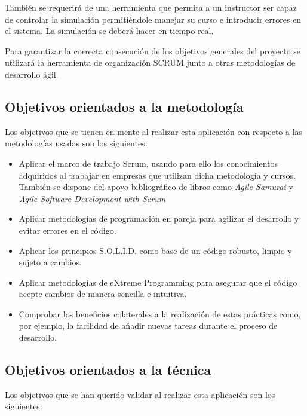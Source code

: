 \documentclass[12pt,a4paper,spanish]{book} %
\begin{document}
También se requerirá de una herramienta que permita a un instructor ser capaz de controlar la simulación permitiéndole manejar su curso e introducir errores en el sistema. La simulación se deberá hacer en tiempo real.

Para garantizar la correcta consecución de los objetivos generales del proyecto se utilizará la herramienta de organización SCRUM junto a otras metodologías de desarrollo ágil.

\subsection{Objetivos orientados a la metodología}

Los objetivos que se tienen en mente al realizar esta aplicación con respecto a
las metodologías usadas son los siguientes:

\begin{itemize}
  \item Aplicar el marco de trabajo Scrum, usando para ello los conocimientos
  adquiridos al trabajar en empresas que utilizan dicha metodología y cursos.
  También se dispone del apoyo bibliográfico de libros como \emph{Agile Samurai} y \emph{Agile Software Development with Scrum}

  \item Aplicar metodologías de programación en pareja para agilizar el desarrollo y evitar errores en el código.

  \item Aplicar los principios S.O.L.I.D. como base de un código robusto, limpio y sujeto a cambios.

  \item Aplicar metodologías de eXtreme Programming para asegurar que el código acepte cambios de manera sencilla e intuitiva.

  \item Comprobar los beneficios colaterales a la realización de estas
  prácticas como, por ejemplo, la facilidad de a\'nadir nuevas tareas durante el
  proceso de desarrollo.
 
\end{itemize}

\subsection{Objetivos orientados a la técnica}

Los objetivos que se han querido validar al realizar esta aplicación son los
siguientes:
\end{document}
